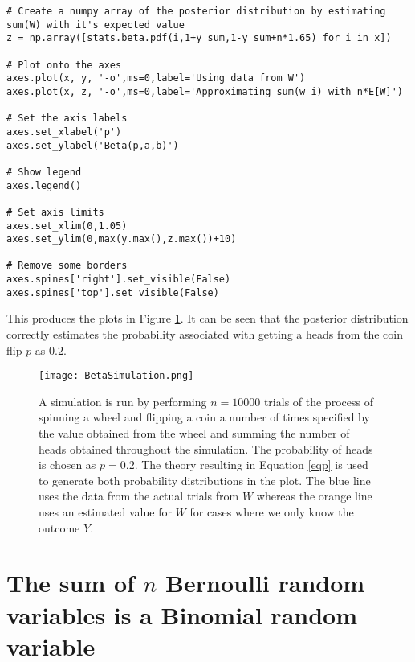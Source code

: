 \documentclass{article}
\begin{document}
\begin{flushleft}
\begin{lstlisting}
# Create a numpy array of the posterior distribution by estimating sum(W) with it's expected value
z = np.array([stats.beta.pdf(i,1+y_sum,1-y_sum+n*1.65) for i in x])

# Plot onto the axes
axes.plot(x, y, '-o',ms=0,label='Using data from W')
axes.plot(x, z, '-o',ms=0,label='Approximating sum(w_i) with n*E[W]')

# Set the axis labels
axes.set_xlabel('p')
axes.set_ylabel('Beta(p,a,b)')

# Show legend
axes.legend()

# Set axis limits
axes.set_xlim(0,1.05)
axes.set_ylim(0,max(y.max(),z.max())+10)

# Remove some borders
axes.spines['right'].set_visible(False)
axes.spines['top'].set_visible(False)
\end{lstlisting}

This produces the plots in Figure \ref{fig:BetaSim}. It can be seen that the posterior distribution correctly estimates the probability associated with getting a heads from the coin flip $p$ as $0.2$.

\begin{figure}
    \centering
    \texttt{[image: BetaSimulation.png]}
    \caption{A simulation is run by performing $n=10000$ trials of the process of spinning a wheel and flipping a coin a number of times specified by the value obtained from the wheel and summing the number of heads obtained throughout the simulation. The probability of heads is chosen as $p=0.2$. The theory resulting in Equation \ref{eqp} is used to generate both probability distributions in the plot. The blue line uses the data from the actual trials from $W$ whereas the orange line uses an estimated value for $W$ for cases where we only know the outcome $Y$.}
    \label{fig:BetaSim}
\end{figure}

\end{flushleft}

\newpage

\appendix

\section{The sum of $n$ Bernoulli random variables is a Binomial random variable}\label{sec:bin}
\end{document}
